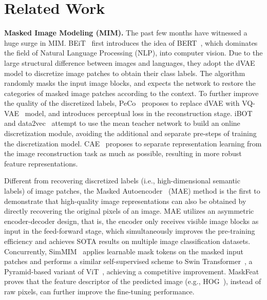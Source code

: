 \documentclass{article}
\begin{document}
\section{Related Work}
\textbf{Masked Image Modeling (MIM).}
The past few months have witnessed a huge surge in MIM. BEiT~\cite{bao2021beit} first introduces the idea of BERT~\cite{devlin2018bert}, which dominates the field of Natural Language Processing (NLP), into computer vision. Due to the large structural difference between images and languages, they adopt the dVAE~\cite{ramesh2021zero} model to discretize image patches to obtain their class labels. The algorithm randomly masks the input image blocks, and expects the network to restore the categories of masked image patches  according to the context. To further improve the quality of the discretized labels, PeCo~\cite{dong2021peco} proposes to replace dVAE with VQ-VAE~\cite{van2017neural} model, and introduces perceptual loss in the reconstruction stage. iBOT~\cite{zhou2021ibot} and data2vec~\cite{baevski2022data2vec} attempt to use the mean teacher network to build an online discretization module, avoiding the additional and separate pre-steps of training the discretization model. CAE~\cite{chen2022context} proposes to separate representation learning from the image reconstruction task as much as possible, resulting in more robust feature representations.

Different from recovering discretized labels (i.e., high-dimensional semantic labels) of image patches, the Masked Autoencoder~\cite{he2021masked} (MAE) method is the first to demonstrate that high-quality image representations can also be obtained by directly recovering the original pixels of an image. MAE utilizes an asymmetric encoder-decoder design, that is, the encoder only receives visible image blocks as input in the feed-forward stage, which simultaneously improves the pre-training efficiency and achieves SOTA results on multiple image classification datasets. Concurrently, SimMIM~\cite{xie2021simmim} applies learnable mask tokens on the masked input patches and performs a similar self-supervised scheme to Swin Transformer~\cite{liu2021swin}, a Pyramid-based variant of ViT~\cite{dosovitskiy2020image}, achieving a competitive improvement. MaskFeat~\cite{wei2021masked} proves that the feature descriptor of the predicted image (e.g., HOG~\cite{dalal2005histograms}), instead of raw pixels, can further improve the fine-tuning performance.
\end{document}
